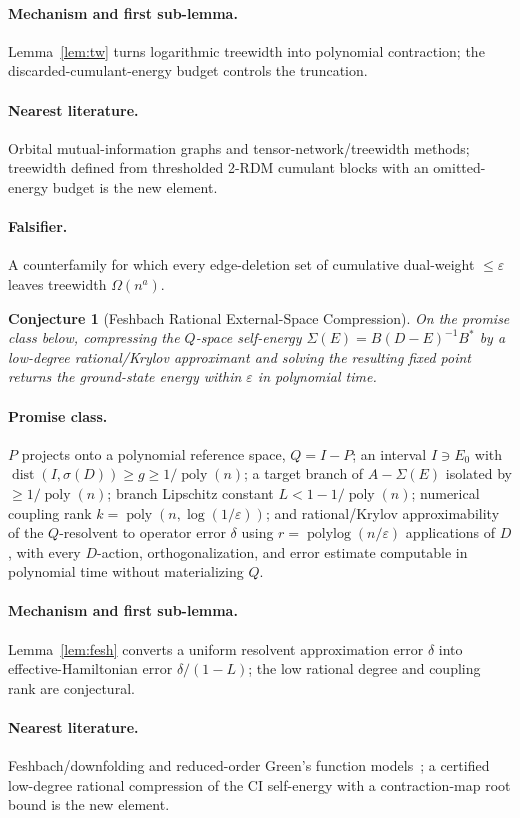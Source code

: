 \documentclass[11pt]{article}
\newtheorem{conjecture}{Conjecture}
\theoremstyle{definition}
\newcommand{\eps}{\varepsilon}
\newcommand{\poly}{\operatorname{poly}}
\newcommand{\polylog}{\operatorname{polylog}}
\DeclareMathOperator{\dist}{dist}
\begin{document}
\paragraph{Mechanism and first sub-lemma.}  Lemma~\ref{lem:tw} turns logarithmic
treewidth into polynomial contraction; the discarded-cumulant-energy budget
controls the truncation.
\paragraph{Nearest literature.}  Orbital mutual-information graphs and
tensor-network/treewidth methods; treewidth defined from thresholded 2-RDM
cumulant blocks with an omitted-energy budget is the new element.
\paragraph{Falsifier.}  A counterfamily for which every edge-deletion set of
cumulative dual-weight $\le\eps$ leaves treewidth $\Omega(n^a)$.

\begin{conjecture}[Feshbach Rational External-Space Compression]\label{p5}
On the promise class below, compressing the $Q$-space self-energy
$\Sigma(E)=B(D-E)^{-1}B^*$ by a low-degree rational/Krylov approximant and solving
the resulting fixed point returns the ground-state energy within $\eps$ in
polynomial time.
\end{conjecture}
\paragraph{Promise class.}  $P$ projects onto a polynomial reference space,
$Q=I-P$; an interval $I\ni E_0$ with $\dist(I,\sigma(D))\ge g\ge1/\poly(n)$; a
target branch of $A-\Sigma(E)$ isolated by $\ge1/\poly(n)$; branch Lipschitz
constant $L<1-1/\poly(n)$; numerical coupling rank $k=\poly(n,\log(1/\eps))$; and
rational/Krylov approximability of the $Q$-resolvent to operator error $\delta$
using $r=\polylog(n/\eps)$ applications of $D$, with every $D$-action,
orthogonalization, and error estimate computable in polynomial time without
materializing $Q$.
\paragraph{Mechanism and first sub-lemma.}  Lemma~\ref{lem:fesh} converts a
uniform resolvent approximation error $\delta$ into effective-Hamiltonian error
$\delta/(1-L)$; the low rational degree and coupling rank are conjectural.
\paragraph{Nearest literature.}  Feshbach/downfolding and reduced-order Green's
function models~\cite{R12}; a certified low-degree rational compression of the CI
self-energy with a contraction-map root bound is the new element.
\end{document}
